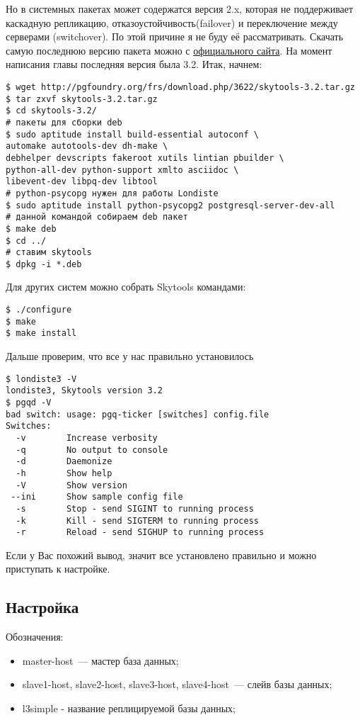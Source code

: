 Но в системных пакетах может содержатся версия 2.x, которая не поддерживает каскадную репликацию, отказоустойчивость(failover) и переключение между серверами (switchover). По этой причине я не буду её рассматривать. Скачать самую последнюю версию пакета можно с \href{http://pgfoundry.org/projects/skytools}{официального сайта}. На момент написания главы последняя версия была 3.2. Итак, начнем:

\begin{lstlisting}[label=lst:londiste2,caption=Установка]
$ wget http://pgfoundry.org/frs/download.php/3622/skytools-3.2.tar.gz
$ tar zxvf skytools-3.2.tar.gz
$ cd skytools-3.2/
# пакеты для сборки deb
$ sudo aptitude install build-essential autoconf \
automake autotools-dev dh-make \
debhelper devscripts fakeroot xutils lintian pbuilder \
python-all-dev python-support xmlto asciidoc \
libevent-dev libpq-dev libtool
# python-psycopg нужен для работы Londiste
$ sudo aptitude install python-psycopg2 postgresql-server-dev-all
# данной командой собираем deb пакет
$ make deb
$ cd ../
# ставим skytools
$ dpkg -i *.deb
\end{lstlisting}

Для других систем можно собрать Skytools командами:

\begin{lstlisting}[label=lst:londiste3,caption=Установка]
$ ./configure
$ make
$ make install
\end{lstlisting}

Дальше проверим, что все у нас правильно установилось
\begin{lstlisting}[label=lst:londiste4,caption=Установка]
$ londiste3 -V
londiste3, Skytools version 3.2
$ pgqd -V
bad switch: usage: pgq-ticker [switches] config.file
Switches:
  -v        Increase verbosity
  -q        No output to console
  -d        Daemonize
  -h        Show help
  -V        Show version
 --ini      Show sample config file
  -s        Stop - send SIGINT to running process
  -k        Kill - send SIGTERM to running process
  -r        Reload - send SIGHUP to running process
\end{lstlisting}

Если у Вас похожий вывод, значит все установлено правильно и можно приступать к настройке.


\subsection{Настройка}

Обозначения:
\begin{itemize}
  \item master-host~--- мастер база данных;
  \item slave1-host, slave2-host, slave3-host, slave4-host~--- слейв базы данных;
  \item l3simple - название реплицируемой базы данных;
\end{itemize}

